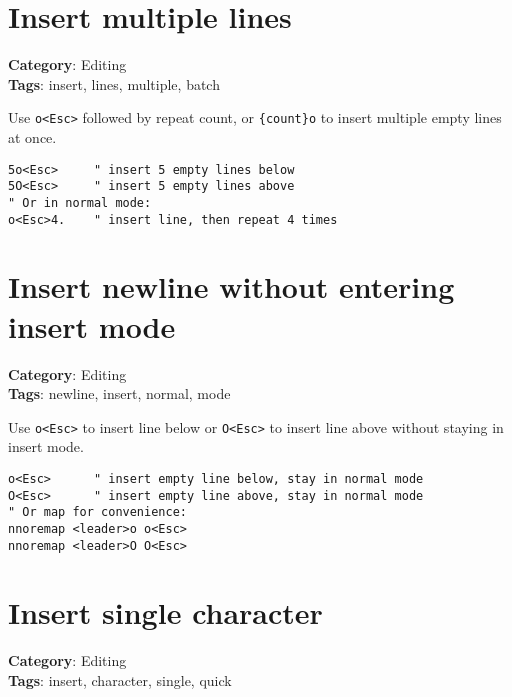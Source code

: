 {{{{\section{Insert multiple lines}

\textbf{Category}: Editing\\ \textbf{Tags}: insert, lines, multiple, batch
\vspace{0.5cm}

Use {\footnotesize \Verb§o<Esc>§} followed by repeat count, or {\footnotesize \Verb§{count}o§} to insert multiple empty lines at once.

\begin{Exa*}{}
\begin{Verbatim}[fontsize=\footnotesize, breaklines, breakanywhere]
5o<Esc>     " insert 5 empty lines below
5O<Esc>     " insert 5 empty lines above
" Or in normal mode:
o<Esc>4.    " insert line, then repeat 4 times
\end{Verbatim}
\end{Exa*}

\section{Insert newline without entering insert mode}

\textbf{Category}: Editing\\ \textbf{Tags}: newline, insert, normal, mode
\vspace{0.5cm}

Use {\footnotesize \Verb§o<Esc>§} to insert line below or {\footnotesize \Verb§O<Esc>§} to insert line above without staying in insert mode.

\begin{Exa*}{}
\begin{Verbatim}[fontsize=\footnotesize, breaklines, breakanywhere]
o<Esc>      " insert empty line below, stay in normal mode
O<Esc>      " insert empty line above, stay in normal mode
" Or map for convenience:
nnoremap <leader>o o<Esc>
nnoremap <leader>O O<Esc>
\end{Verbatim}
\end{Exa*}

\section{Insert single character}

\textbf{Category}: Editing\\ \textbf{Tags}: insert, character, single, quick
\vspace{0.5cm}

}}}}
